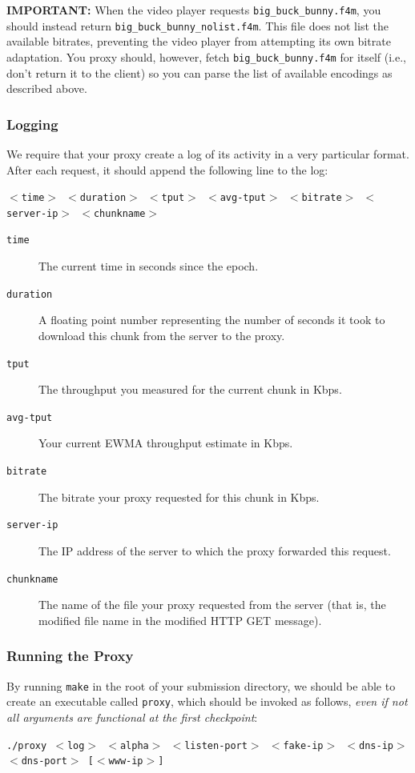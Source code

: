 \documentclass{article}
\begin{document}
\medskip \noindent \textbf{IMPORTANT:} When the video player requests
\texttt{big\_buck\_bunny.f4m}, you should instead return
\texttt{big\_buck\_bunny\_nolist.f4m}. This file does not list the available
bitrates, preventing the video player from attempting its own bitrate
adaptation. You proxy should, however, fetch \texttt{big\_buck\_bunny.f4m} for
itself (i.e., don't return it to the client) so you can parse the list of
available encodings as described above.


\subsubsection{Logging}
\label{sec:proxy-logging}

We require that your proxy create a log of its activity in a very particular
format. After each request, it should append the following line to the log:
\begin{center}
	\texttt{$<$time$>$ $<$duration$>$ $<$tput$>$ $<$avg-tput$>$ $<$bitrate$>$ $<$server-ip$>$ $<$chunkname$>$}
\end{center}

\begin{description}
	\item[\texttt{time}] The current time in seconds since the epoch.
	\item[\texttt{duration}] A floating point number representing the number of
	seconds it took to download this chunk from the server to the proxy.
	\item[\texttt{tput}] The throughput you measured for the current chunk in
	Kbps.
	\item[\texttt{avg-tput}] Your current EWMA throughput estimate in Kbps.
	\item[\texttt{bitrate}] The bitrate your proxy requested for this chunk in
	Kbps.
	\item[\texttt{server-ip}] The IP address of the server to which the proxy
	forwarded this request.
	\item[\texttt{chunkname}] The name of the file your proxy requested from
	the server (that is, the modified file name in the modified HTTP GET
	message).
\end{description}


\subsubsection{Running the Proxy}
\label{sec:running-proxy}

By running \texttt{make} in the root of your submission directory, we should be
able to create an executable called \texttt{proxy}, which should be invoked as
follows, \emph{even if not all arguments are functional at the first checkpoint}:
\begin{center}
	\texttt{./proxy $<$log$>$ $<$alpha$>$ $<$listen-port$>$ $<$fake-ip$>$ $<$dns-ip$>$ $<$dns-port$>$ [$<$www-ip$>$]}
\end{center}
\end{document}
